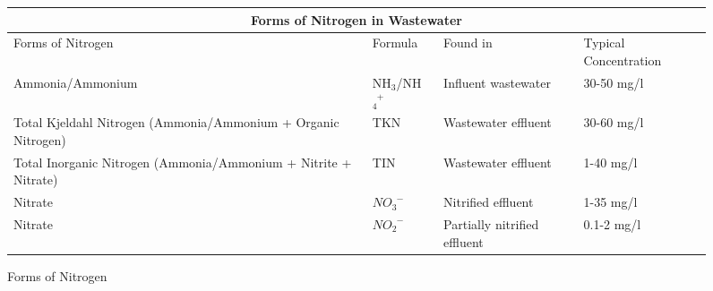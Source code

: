 \documentclass{article}
\begin{document}
					      \begin{center}
					      \begin{figure}[!htbp]
					      	\noindent \begin{tabular}[!htbp]{ |p{6cm}|p{2.0cm}|p{2.5cm}|p{}|}
					      	\hline
					      	\multicolumn{4}{|c|}{\textbf{Forms of Nitrogen in Wastewater}} \\
					      	\hline
					      	
					      	\hspace{1.8 cm}Forms of Nitrogen & \hspace{0.25 cm} Formula & \hspace{.4 cm} Found in & \hspace{.4 cm} Typical \newline \hspace{.2 cm}Concentration\\
					      	\hline
					      	\small Ammonia/Ammonium & \small NH$_3$/NH$_4^{\enspace +}$ &  \small Influent wastewater & 30-50 mg/l\\
					      	
					      	Total Kjeldahl Nitrogen \newline  \small (Ammonia/Ammonium + Organic Nitrogen) &  \small TKN &  \small Wastewater \newline  \small effluent  & 30-60 mg/l \\
					      	
					      	\small Total Inorganic Nitrogen \newline  \small (Ammonia/Ammonium + Nitrite + Nitrate) & \small TIN &  \small  Wastewater \newline  \small effluent  & 1-40 mg/l \\
					      	
					      	\small Nitrate  & $NO_3^{\enspace -}$ &  \small Nitrified effluent &  \small 1-35 mg/l \\
					      	
					      	\small Nitrate  &  $NO_2^{\enspace -}$ &  \small Partially nitrified effluent &  \small 0.1-2 mg/l \\
					      	
					      	\hline
					      	\end{tabular}
					      	\caption{Forms of Nitrogen}
					      	\end{figure}
					      \end{center}
					      
\end{document}
